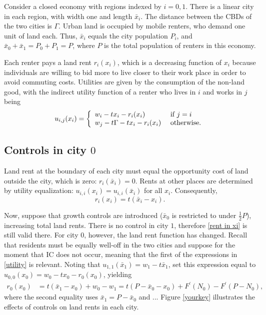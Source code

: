 \documentclass[12pt]{article}%
\begin{document}
Consider a closed economy with regions indexed by $i=0,1$. There is a linear city in each region, with width one and length $\bar{x}_{i}$. The distance between the CBDs of the two cities is $\Gamma$. Urban land is occupied by mobile renters, who demand one unit of land each. Thus, $\bar{x}_{i}$ equals the city population $P_{i}$, and $\bar{x}_{0}+\bar{x}_{1}=P_{0}+P_{1}=P$, where $P$ is the total population of renters in this economy. 

Each renter pays a land rent $r_{i}(x_{i})$, which is a decreasing function of $x_{i}$ because individuals are willing to bid more to live closer to their work place in order to avoid commuting costs. Utilities are
given by the consumption of the non-land good, with the indirect utility
function of a renter who lives in $i$ and works in $j$ being
\begin{equation}
u_{i,j}(x_{i})=\left\{
\begin{array}
[c]{ll}%
w_{i}-tx_{i}-r_{i}(x_{i})\text{ } & \text{if }j=i\\
w_{j}-t\Gamma-tx_{i}-r_{i}(x_{i})\text{ } & \text{otherwise.}%
\end{array}
\right.  \label{utility}%
\end{equation}





\subsection{Controls in city $0$}

Land rent at the boundary of each city must equal the opportunity cost of land
outside the city, which is zero: $r_{i}(\bar{x}_{i})=0$. Rents at other places are determined by utility equalization: $u_{i,i}(x_{i})=u_{i,i}(\bar{x}_{i})$ for all $x_{i}$. Consequently, 
\begin{equation}
r_{i}(x_{i})=t\left(  \bar{x}_{i}-x_{i}\right)  \text{.} \label{rent in xi}%
\end{equation}

Now, suppose that growth controls are introduced ($\bar{x}_{0}$ is restricted to under $\frac{1}{2}P$), increasing total land rents. There is no control in city $1$, therefore \eqref{rent in xi} is still valid there. For city $0$, however, the land rent function has changed. Recall that residents must be equally well-off in the two cities and suppose for the moment that IC does not occur, meaning that the first of the expressions in \eqref{utility} is relevant. Noting that $u_{1,1}(\bar{x}_{1})=w_{1}-t\bar{x}_{1}$, set this expression equal to $u_{0,0}(x_{0})=w_{0}-tx_{0}-r_{0}(x_{0})$, yielding
\begin{align}
r_{0}(x_{0})  &  =t\left(  \bar{x}_{1}-x_{0}\right)  +w_{0}-w_{1} =t\left(  P-\bar{x}_{0}-x_{0}\right)  +F^{\prime}(N_{0})-F^{\prime}%
(P-N_{0})\text{,} \label{rent in x0 under control}%
\end{align}
where the second equality uses $\bar{x}_{1}=P-\bar{x}_{0}$ and ...
Figure \ref{yourkey} illustrates the effects of controls on land rents in each city.
\end{document}
